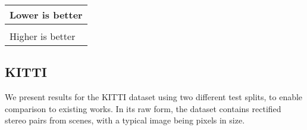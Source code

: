 \documentclass[10pt,twocolumn,letterpaper]{article}
\makeatletter
\newcommand*{\ea}{et al.\@\xspace}
\makeatother
\begin{document}
\begin{table*}[t]
{  \begin{tabular}{|l|}
    \hline
      \cellcolor{col1} Lower is better\\ \hline
      \\ \hline
      \cellcolor{col2} Higher is better\\ \hline   
  \end{tabular}
  
  }
  \vspace{10pt}
  \caption{Results on KITTI 2015 \cite{Geiger2012CVPR} using the split of Eigen \ea\cite{eigen2014depth}. 
  For training, K is the KITTI dataset \cite{Geiger2012CVPR} and CS is Cityscapes \cite{Cordts2016Cityscapes}.
  The predictions of Liu \ea\cite{liu2015learning}\mbox{*} are generated on a mix of the left and right images instead of just the left input images. 
  For a fair comparison, we compute their results relative to the correct image.
  As in the provided source code, Eigen \ea\cite{eigen2014depth} results are computed relative to the velodyne instead of the camera. 
  Garg \ea\cite{garg2016unsupervised} results are taken directly from their paper. All results, except \cite{eigen2014depth}, use the crop from \cite{garg2016unsupervised}.
  We also show our results with the same crop and maximum evaluation distance. The last two rows are computed on the uncropped ground truth.}
    \label{tab:kitti_eigen}
    \vspace{-10pt}
\end{table*}


\subsection{KITTI}
We present results for the KITTI dataset \cite{Geiger2012CVPR} using two different test splits, to enable comparison to existing works. 
In its raw form, the dataset contains  rectified stereo pairs from  scenes, with a typical image being  pixels in size.
\end{document}
